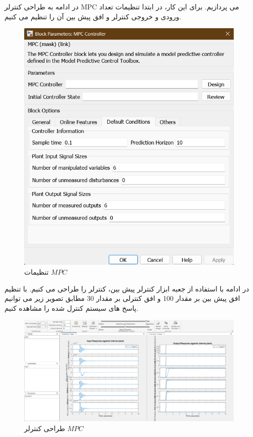 در ادامه به طراحی کنترلر MPC می پردازیم. برای این کار، در ابتدا تنظیمات تعداد ورودی و خروجی کنترلر و افق پیش بین آن را تنظیم می کنیم.
\begin{figure}[H]
	\centering
	\includegraphics[width=0.7\linewidth]{../img/LMPC_Config}
	\caption{تنظیمات $MPC$}
	\label{fig:lmpcconfig}
\end{figure}

در ادامه با استفاده از جعبه ابزار کنترلر پیش بین، کنترلر را طراحی می کنیم. با تنظیم افق پیش بین بر مقدار 100 و افق کنترلی بر مقدار 30 مطابق تصویر زیر می توانیم پاسخ های سیستم کنترل شده را مشاهده کنیم.
\begin{figure}[H]
	\centering
	\includegraphics[width=1\linewidth]{../img/LMPC_Setup}
	\caption{طراحی کنترلر $MPC$}
	\label{fig:lmpcsetup}
\end{figure}

